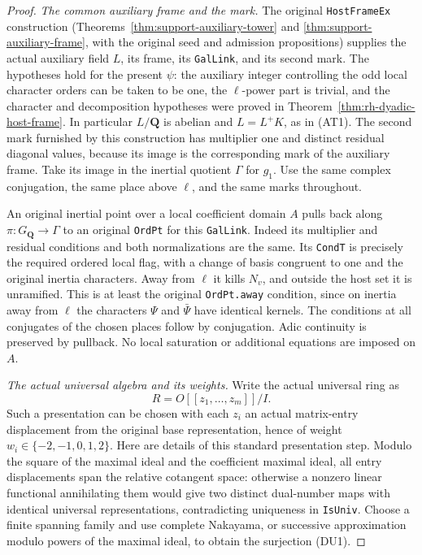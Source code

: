 \begin{proof}
\emph{The common auxiliary frame and the mark.}
The original \texttt{HostFrameEx} construction
(Theorems~\ref{thm:support-auxiliary-tower} and
\ref{thm:support-auxiliary-frame}, with the original seed and
admission propositions) supplies the actual auxiliary field $L$,
its frame, its \texttt{GalLink}, and its second mark.
The hypotheses hold for the present $\psi$:
the auxiliary integer controlling the odd local character orders
can be taken to be one, the $\ell$-power part is trivial, and
the character and decomposition hypotheses were proved in
Theorem~\ref{thm:rh-dyadic-host-frame}.  In particular $L/\mathbf Q$
is abelian and $L=L^+K$, as in (AT1).  The second mark furnished
by this construction has multiplier one and distinct residual
diagonal values, because its image is the corresponding mark
of the auxiliary frame.  Take its image in the inertial
quotient $\Gamma$ for $g_1$.  Use the same complex conjugation,
the same place above $\ell$, and the same marks throughout.

An original inertial point over a local coefficient domain $A$
pulls back along $\pi:G_{\mathbf Q}\to\Gamma$ to an original
\texttt{OrdPt} for this \texttt{GalLink}.  Indeed its multiplier
and residual conditions and both normalizations are the same.
Its \texttt{CondT} is precisely the required ordered local
flag, with a change of basis congruent to one and the original
inertia characters.  Away from $\ell$ it kills $N_v$, and
outside the host set it is unramified.  This is at least the
original \texttt{OrdPt.away} condition, since on inertia away
from $\ell$ the characters $\Psi$ and $\bar\Psi$ have identical
kernels.  The conditions at all conjugates of the chosen
places follow by conjugation.  Adic continuity is preserved
by pullback.  No local saturation or additional equations
are imposed on $A$.

\emph{The actual universal algebra and its weights.}
Write the actual universal ring as
\[
             R=O[[z_1,\ldots,z_m]]/I.                           \tag{DU1}
\]
Such a presentation can be chosen with each $z_i$ an actual
matrix-entry displacement from the original base
representation, hence of weight $w_i\in\{-2,-1,0,1,2\}$.
Here are details of this standard presentation step.
Modulo the square of the maximal ideal and the coefficient
maximal ideal, all entry displacements span the relative
cotangent space: otherwise a nonzero linear functional
annihilating them would give two distinct dual-number maps
with identical universal representations, contradicting
uniqueness in \texttt{IsUniv}.  Choose a finite spanning family
and use complete Nakayama, or successive approximation modulo
powers of the maximal ideal, to obtain the surjection (DU1).


\end{proof}
